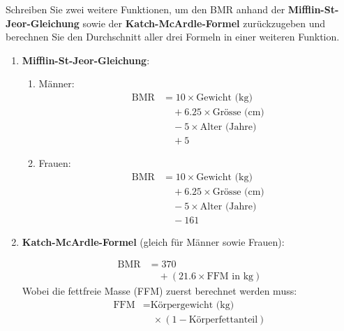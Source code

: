 \begin{myexercise}\label{ex:bmr}
	Schreiben Sie zwei weitere Funktionen, um den \gls{BMR} anhand der \textbf{Mifflin-St-Jeor-Gleichung} sowie der \textbf{Katch-McArdle-Formel} zurückzugeben und berechnen Sie den Durchschnitt aller drei Formeln in einer weiteren Funktion.
	\begin{enumerate}
		\item \textbf{Mifflin-St-Jeor-Gleichung}:
		      \begin{enumerate}
			      \item Männer:
			            \begin{align*}
				            \text{BMR} & = 10 \times \text{Gewicht (kg)}        \\
				                       & \quad + 6.25 \times \text{Grösse (cm)} \\
				                       & \quad - 5 \times \text{Alter (Jahre)}  \\
				                       & \quad + 5
			            \end{align*}
			      \item Frauen:
			            \begin{align*}
				            \text{BMR} & = 10 \times \text{Gewicht (kg)}        \\
				                       & \quad + 6.25 \times \text{Grösse (cm)} \\
				                       & \quad - 5 \times \text{Alter (Jahre)}  \\
				                       & \quad - 161
			            \end{align*}
		      \end{enumerate}
		\item \textbf{Katch-McArdle-Formel} (gleich für Männer sowie Frauen):

		      \begin{align*}
			      \text{BMR} & = 370                                  \\
			                 & \quad + (21.6 \times \text{FFM in kg})
		      \end{align*}
		      Wobei die fettfreie Masse (FFM) zuerst berechnet werden muss:
		      \begin{align*}
			      \text{FFM} & = \text{Körpergewicht (kg)}                \\
			                 & \quad \times (1 - \text{Körperfettanteil})
		      \end{align*}

	\end{enumerate}

	\begin{myanswer} %
		
	\end{myanswer}
\end{myexercise}

